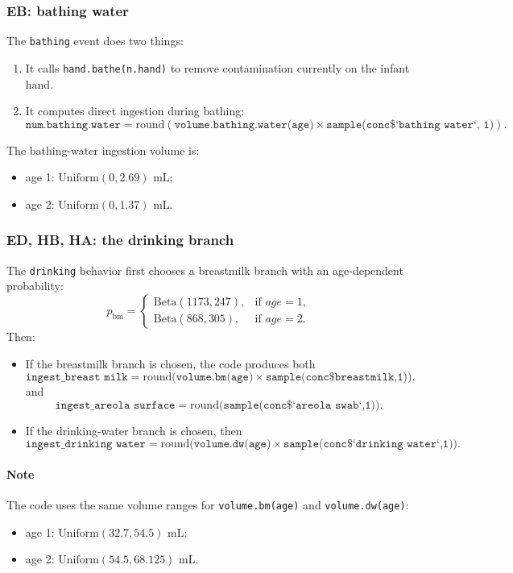 \documentclass[11pt]{article}
\begin{document}
\subsubsection*{EB: bathing water}
The \texttt{bathing} event does two things:
\begin{enumerate}[leftmargin=2em]
  \item It calls \texttt{hand.bathe(n.hand)} to remove contamination currently on the infant hand.
  \item It computes direct ingestion during bathing:
  \[
  \texttt{num.bathing.water} =
  \mathrm{round}\left(
  \texttt{volume.bathing.water(age)} \times
  \texttt{sample(conc\$`bathing water`, 1)}
  \right).
  \]
\end{enumerate}
The bathing-water ingestion volume is:
\begin{itemize}[leftmargin=2em]
  \item age 1: \(\mathrm{Uniform}(0, 2.69)\) mL;
  \item age 2: \(\mathrm{Uniform}(0, 1.37)\) mL.
\end{itemize}

\subsubsection*{ED, HB, HA: the drinking branch}
The \texttt{drinking} behavior first chooses a breastmilk branch with an age-dependent probability:
\[
p_{\text{bm}} =
\begin{cases}
\mathrm{Beta}(1173, 247), & \text{if } age = 1,\\
\mathrm{Beta}(868, 305), & \text{if } age = 2.
\end{cases}
\]
Then:
\begin{itemize}[leftmargin=2em]
  \item If the breastmilk branch is chosen, the code produces both
  \[
  \texttt{ingest\_breast milk}
  =
  \mathrm{round}\bigl(\texttt{volume.bm(age)} \times \texttt{sample(conc\$breastmilk,1)}\bigr),
  \]
  and
  \[
  \texttt{ingest\_areola surface}
  =
  \mathrm{round}\bigl(\texttt{sample(conc\$`areola swab`,1)}\bigr).
  \]
  \item If the drinking-water branch is chosen, then
  \[
  \texttt{ingest\_drinking water}
  =
  \mathrm{round}\bigl(\texttt{volume.dw(age)} \times \texttt{sample(conc\$`drinking water`,1)}\bigr).
  \]
\end{itemize}

\paragraph{Note}
The code uses the same volume ranges for \texttt{volume.bm(age)} and \texttt{volume.dw(age)}:
\begin{itemize}[leftmargin=2em]
  \item age 1: \(\mathrm{Uniform}(32.7, 54.5)\) mL;
  \item age 2: \(\mathrm{Uniform}(54.5, 68.125)\) mL.
\end{itemize}
\end{document}

